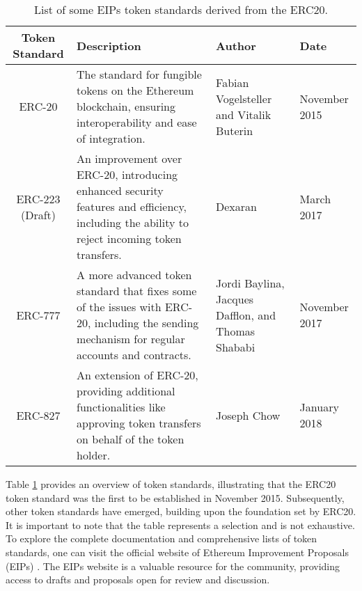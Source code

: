 \begin{table}[h]
   \begin{tabular}{|c|p{5cm}|p{3cm}|p{2cm}|}
       \hline
       \rowcolor{gray!50} %
       \textbf{Token Standard} & \textbf{Description}                                                                                                                          & \textbf{Author}                                    & \textbf{Date} \\
       \hline
       ERC-20                  & The standard for fungible tokens on the Ethereum blockchain, ensuring interoperability and ease of integration.                               & Fabian Vogelsteller and Vitalik Buterin            & November 2015 \\
       \hline
       ERC-223 (Draft)         & An improvement over ERC-20, introducing enhanced security features and efficiency, including the ability to reject incoming token transfers.  & Dexaran                                            & March 2017    \\
       \hline
       ERC-777                 & A more advanced token standard that fixes some of the issues with ERC-20, including the sending mechanism for regular accounts and contracts. & Jordi Baylina, Jacques Dafflon, and Thomas Shababi & November 2017 \\
       \hline
       ERC-827                 & An extension of ERC-20, providing additional functionalities like approving token transfers on behalf of the token holder.                    & Joseph Chow                                        & January 2018  \\
       \hline
   \end{tabular}
   \caption{List of some  EIPs token standards derived from the ERC20.}
   \label{tab:token_standards}
\end{table}

Table \ref{tab:token_standards} provides an overview of token standards, illustrating that the ERC20 token standard was the first to be established in November 2015.
Subsequently, other token standards have emerged, building upon the foundation set by ERC20. It is important to note that the table represents a selection and is not exhaustive. To explore the complete documentation and comprehensive lists of token standards, one can visit the official website of Ethereum Improvement Proposals (EIPs)
\cite{ethereum_eip}. The EIPs website is a valuable resource for the community, providing access to drafts and proposals open for review and discussion.


